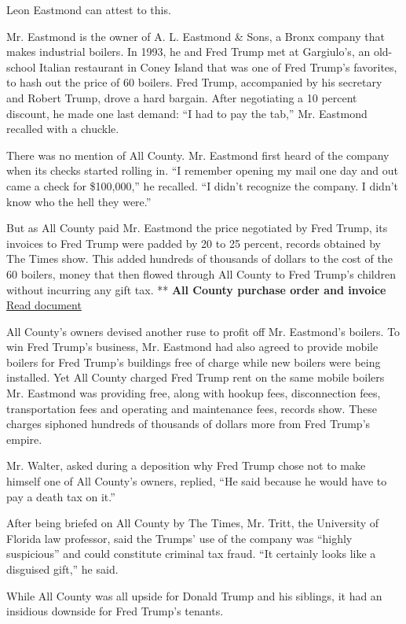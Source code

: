 Leon Eastmond can attest to this.

Mr. Eastmond is the owner of A. L. Eastmond \& Sons, a Bronx company
that makes industrial boilers. In 1993, he and Fred Trump met at
Gargiulo's, an old-school Italian restaurant in Coney Island that was
one of Fred Trump's favorites, to hash out the price of 60 boilers. Fred
Trump, accompanied by his secretary and Robert Trump, drove a hard
bargain. After negotiating a 10 percent discount, he made one last
demand: ``I had to pay the tab,'' Mr. Eastmond recalled with a chuckle.

There was no mention of All County. Mr. Eastmond first heard of the
company when its checks started rolling in. ``I remember opening my mail
one day and out came a check for \$100,000,'' he recalled. ``I didn't
recognize the company. I didn't know who the hell they were.''

But as All County paid Mr. Eastmond the price negotiated by Fred Trump,
its invoices to Fred Trump were padded by 20 to 25 percent, records
obtained by The Times show. This added hundreds of thousands of dollars
to the cost of the 60 boilers, money that then flowed through All County
to Fred Trump's children without incurring any gift tax. ** \textbf{All
County purchase order and invoice}
\href{https://int.graylady3jvrrxbe.onion/data/documenthelper/336-all-county-invoice/12e771601b10479cbd9c/optimized/full.pdf\#page=1}{Read
document}

All County's owners devised another ruse to profit off Mr. Eastmond's
boilers. To win Fred Trump's business, Mr. Eastmond had also agreed to
provide mobile boilers for Fred Trump's buildings free of charge while
new boilers were being installed. Yet All County charged Fred Trump rent
on the same mobile boilers Mr. Eastmond was providing free, along with
hookup fees, disconnection fees, transportation fees and operating and
maintenance fees, records show. These charges siphoned hundreds of
thousands of dollars more from Fred Trump's empire.

Mr. Walter, asked during a deposition why Fred Trump chose not to make
himself one of All County's owners, replied, ``He said because he would
have to pay a death tax on it.''

After being briefed on All County by The Times, Mr. Tritt, the
University of Florida law professor, said the Trumps' use of the company
was ``highly suspicious'' and could constitute criminal tax fraud. ``It
certainly looks like a disguised gift,'' he said.

While All County was all upside for Donald Trump and his siblings, it
had an insidious downside for Fred Trump's tenants.

